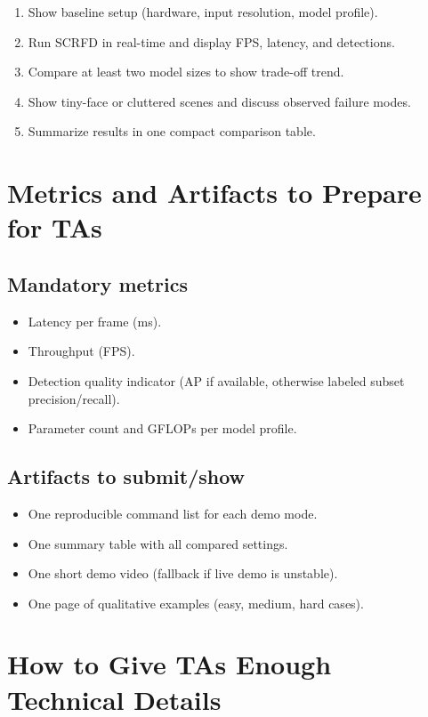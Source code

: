 \begin{enumerate}
  \item Show baseline setup (hardware, input resolution, model profile).
  \item Run SCRFD in real-time and display FPS, latency, and detections.
  \item Compare at least two model sizes to show trade-off trend.
  \item Show tiny-face or cluttered scenes and discuss observed failure modes.
  \item Summarize results in one compact comparison table.
\end{enumerate}

\section{Metrics and Artifacts to Prepare for TAs}

\subsection{Mandatory metrics}
\begin{itemize}
  \item Latency per frame (ms).
  \item Throughput (FPS).
  \item Detection quality indicator (AP if available, otherwise labeled subset precision/recall).
  \item Parameter count and GFLOPs per model profile.
\end{itemize}

\subsection{Artifacts to submit/show}
\begin{itemize}
  \item One reproducible command list for each demo mode.
  \item One summary table with all compared settings.
  \item One short demo video (fallback if live demo is unstable).
  \item One page of qualitative examples (easy, medium, hard cases).
\end{itemize}

\section{How to Give TAs Enough Technical Details}

